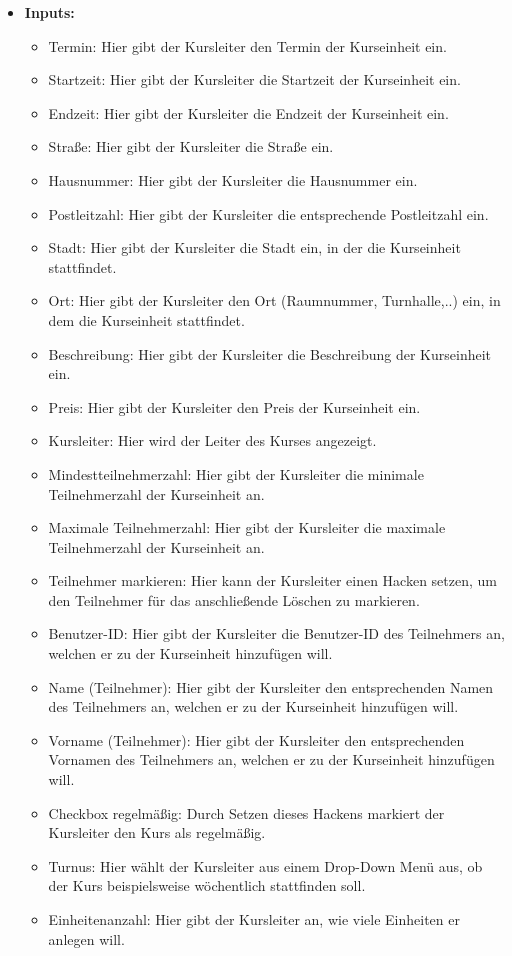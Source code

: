 \begin{itemize}
				
			\item \textbf{Inputs:}
				\begin{itemize}
					\item Termin: Hier gibt der Kursleiter den Termin der Kurseinheit ein.
					\item Startzeit: Hier gibt der Kursleiter die Startzeit der Kurseinheit ein.
					\item Endzeit: Hier gibt der Kursleiter die Endzeit der Kurseinheit ein.
					\item Straße: Hier gibt der Kursleiter die Straße ein.
					\item Hausnummer: Hier gibt der Kursleiter die Hausnummer ein.
					\item Postleitzahl: Hier gibt der Kursleiter die entsprechende Postleitzahl ein.
					\item Stadt: Hier gibt der Kursleiter die Stadt ein, in der die Kurseinheit stattfindet.
					\item Ort: Hier gibt der Kursleiter den Ort (Raumnummer, Turnhalle,..) ein, in dem die Kurseinheit stattfindet.
					\item Beschreibung: Hier gibt der Kursleiter die Beschreibung der Kurseinheit ein.
					\item Preis: Hier gibt der Kursleiter den Preis der Kurseinheit ein.
					\item Kursleiter: Hier wird der Leiter des Kurses angezeigt.
					\item Mindestteilnehmerzahl: Hier gibt der Kursleiter die minimale Teilnehmerzahl der Kurseinheit an.
					\item Maximale Teilnehmerzahl: Hier gibt der Kursleiter die maximale Teilnehmerzahl der Kurseinheit an.
					\item Teilnehmer markieren: Hier kann der Kursleiter einen Hacken setzen, um den Teilnehmer für das anschließende Löschen zu markieren.
					\item Benutzer-ID: Hier gibt der Kursleiter die Benutzer-ID des Teilnehmers an, welchen er zu der Kurseinheit hinzufügen will.
					\item Name (Teilnehmer): Hier gibt der Kursleiter den entsprechenden Namen des Teilnehmers an, welchen er zu der Kurseinheit hinzufügen will.
					\item Vorname (Teilnehmer): Hier gibt der Kursleiter den entsprechenden Vornamen des Teilnehmers an, welchen er zu der Kurseinheit hinzufügen will.
					\item Checkbox regelmäßig: Durch Setzen dieses Hackens markiert der Kursleiter den Kurs als regelmäßig.
					\item Turnus: Hier wählt der Kursleiter aus einem Drop-Down Menü aus, ob der Kurs beispielsweise wöchentlich stattfinden soll.
					\item Einheitenanzahl: Hier gibt der Kursleiter an, wie viele Einheiten er anlegen will.
				\end{itemize}
				

\end{itemize}
